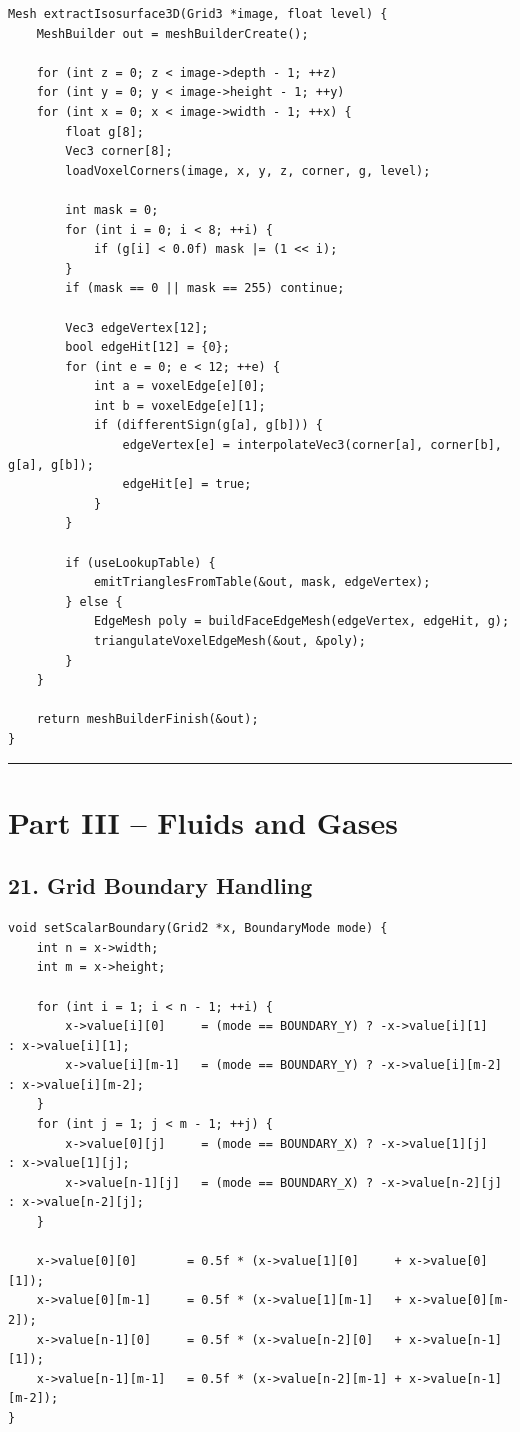\documentclass[10pt,letterpaper]{article}
\begin{document}
\begin{verbatim}
Mesh extractIsosurface3D(Grid3 *image, float level) {
    MeshBuilder out = meshBuilderCreate();

    for (int z = 0; z < image->depth - 1; ++z)
    for (int y = 0; y < image->height - 1; ++y)
    for (int x = 0; x < image->width - 1; ++x) {
        float g[8];
        Vec3 corner[8];
        loadVoxelCorners(image, x, y, z, corner, g, level);

        int mask = 0;
        for (int i = 0; i < 8; ++i) {
            if (g[i] < 0.0f) mask |= (1 << i);
        }
        if (mask == 0 || mask == 255) continue;

        Vec3 edgeVertex[12];
        bool edgeHit[12] = {0};
        for (int e = 0; e < 12; ++e) {
            int a = voxelEdge[e][0];
            int b = voxelEdge[e][1];
            if (differentSign(g[a], g[b])) {
                edgeVertex[e] = interpolateVec3(corner[a], corner[b], g[a], g[b]);
                edgeHit[e] = true;
            }
        }

        if (useLookupTable) {
            emitTrianglesFromTable(&out, mask, edgeVertex);
        } else {
            EdgeMesh poly = buildFaceEdgeMesh(edgeVertex, edgeHit, g);
            triangulateVoxelEdgeMesh(&out, &poly);
        }
    }

    return meshBuilderFinish(&out);
}
\end{verbatim}

\medskip\hrule\medskip

\clearpage
\section*{Part III -- Fluids and Gases}

\subsection*{21. Grid Boundary Handling}

\begin{verbatim}
void setScalarBoundary(Grid2 *x, BoundaryMode mode) {
    int n = x->width;
    int m = x->height;

    for (int i = 1; i < n - 1; ++i) {
        x->value[i][0]     = (mode == BOUNDARY_Y) ? -x->value[i][1]     : x->value[i][1];
        x->value[i][m-1]   = (mode == BOUNDARY_Y) ? -x->value[i][m-2]   : x->value[i][m-2];
    }
    for (int j = 1; j < m - 1; ++j) {
        x->value[0][j]     = (mode == BOUNDARY_X) ? -x->value[1][j]     : x->value[1][j];
        x->value[n-1][j]   = (mode == BOUNDARY_X) ? -x->value[n-2][j]   : x->value[n-2][j];
    }

    x->value[0][0]       = 0.5f * (x->value[1][0]     + x->value[0][1]);
    x->value[0][m-1]     = 0.5f * (x->value[1][m-1]   + x->value[0][m-2]);
    x->value[n-1][0]     = 0.5f * (x->value[n-2][0]   + x->value[n-1][1]);
    x->value[n-1][m-1]   = 0.5f * (x->value[n-2][m-1] + x->value[n-1][m-2]);
}
\end{verbatim}
\end{document}
